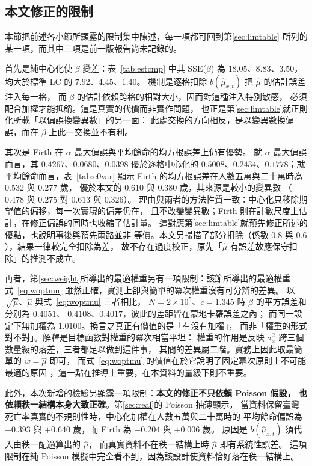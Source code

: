\documentclass[UTF8, fontset=macnew, a4paper, 12pt]{ctexart}
\begin{document}
\subsection{本文修正的限制}\label{sec:lim}

本節把前述各小節所顯露的限制集中陳述，每一項都可回到第\ref{sec:limtable}
所列的某一項，而其中三項是前一版報告尚未記錄的。

首先是純中心化使 $\beta$ 變差：表~\ref{tab:estcmp} 中其 SSE($\beta$)
為 $18.05$、$8.83$、$3.50$，均大於標準 LC 的 $7.92$、$4.45$、$1.40$。
機制是逐格扣除 $b(\hat\mu_{x,t})$ 把 $\hat\mu$ 的估計誤差注入每一格，
而 $\beta$ 的估計依賴跨格的相對大小，因而對這種注入特別敏感，
必須配合加權才能抵銷。這是真實的代價而非實作問題，
也正是第\ref{sec:limtable}就正則化所載「以偏誤換變異數」的另一面：
此處交換的方向相反，是以變異數換偏誤，而在 $\beta$ 上此一交換並不有利。

其次是 Firth 在 $\alpha$ 最大偏誤與平均餘命的均方根誤差上仍有優勢。
就 $\alpha$ 最大偏誤而言，其 $0.4267$、$0.0680$、$0.0398$ 優於逐格中心化的
$0.5008$、$0.2434$、$0.1778$；就平均餘命而言，表~\ref{tab:e0var} 顯示
Firth 的均方根誤差在人數五萬與二十萬時為 $0.532$ 與 $0.277$ 歲，
優於本文的 $0.610$ 與 $0.380$ 歲，其來源是較小的變異數
（$0.478$ 與 $0.275$ 對 $0.613$ 與 $0.326$）。
理由與兩者的方法性質一致：中心化只移除期望值的偏移，每一次實現的偏差仍在，
且不改變變異數；Firth 則在計數尺度上估計，在修正偏誤的同時也收縮了估計量。
這對應第\ref{sec:limtable}就預先修正所述的優點，也說明事後與預先兩路並非
等價。本文另掃描了部分扣除（係數 $0.8$ 與 $0.6$），結果一律較完全扣除為差，
故不存在過度校正，原先「$\hat\mu$ 有誤差故應保守扣除」的推測不成立。

再者，第\ref{sec:weight}所導出的最適權重另有一項限制：該節所導出的最適權重
式~\eqref{eq:woptmu} 雖然正確，實測上卻與簡單的冪次權重沒有可分辨的差異。
以 $\sqrt{\hat\mu}$、$\hat\mu$ 與式~\eqref{eq:woptmu} 三者相比，
$N=2\times10^5$、$c=1.345$ 時 $\beta$ 的平方誤差和分別為 $0.4051$、
$0.4108$、$0.4017$，彼此的差距皆在蒙地卡羅誤差之內；
而同一設定下無加權為 $1.0100$。換言之真正有價值的是「有沒有加權」，
而非「權重的形式對不對」。解釋是目標函數對權重的冪次相當平坦：
權重的作用是反映 $\sigma_x^2$ 跨三個數量級的落差，三者都足以做到這件事，
其間的差異屬二階。實務上因此取最簡單的 $w=\hat\mu$ 即可，
而式~\eqref{eq:woptmu} 的價值在於它說明了固定冪次原則上不可能最適的原因
，這一點在推導上重要，在本資料的量級下則不重要。

此外，本次新增的檢驗另顯露一項限制：\textbf{本文的修正不只依賴 Poisson 假設，
也依賴秩一結構本身大致正確}。第\ref{sec:real}的 Poisson 抽薄顯示，
當資料保留臺灣死亡率真實的不規則性時，中心化加權在人數五萬與二十萬時的
平均餘命偏誤為 $+0.393$ 與 $+0.640$ 歲，而 Firth 為 $-0.204$ 與 $+0.006$ 歲。
原因是 $b(\hat\mu_{x,t})$ 須代入由秩一配適算出的 $\hat\mu$，
而真實資料不在秩一結構上時 $\hat\mu$ 即有系統性誤差。
這項限制在純 Poisson 模擬中完全看不到，因為該設計使資料恰好落在秩一結構上。
\end{document}
